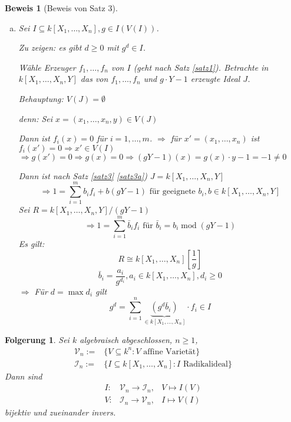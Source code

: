 \documentclass[a4paper, 12pt, numbers=noendperiod, chapterprefix=true, headsepline]{scrbook}
\theoremstyle{break}
\newtheorem{Folg}[Def]{Folgerung}
\theoremstyle{nonumberbreak}
\newtheorem{Bew}{Beweis}
\theoremstyle{nonumberplain}
\DeclareMathOperator{\modmodulo}{mod}%
\newcommand{\calI}{\mathcal{I}}
\newcommand{\calV}{\mathcal{V}}
\begin{document}
\begin{Bew}[Beweis von Satz 3]
\begin{enumerate}[a)]
\begin{enumerate}[(1)]
\begin{enumerate}[(1)]
		$R\neq k \Rightarrow k(X_1)$ ist nicht endlich erzeugbar als $k$-Algebra.
	\item $\Rightarrow R$ ist K\"orper: Sei $a\in R\backslash\{0\}$. In $L$ gibt es $\frac{1}{a}$
		\[\Rightarrow \left(\frac{1}{a}\right)^d+\sum_{j=0}^{d-1} b_j\left(\frac{1}{a} \right)^j\textrm{ f\"ur ein } d\geq1, b_j\in R\]
		\[\Rightarrow 1+\sum_{j=0}^{d-1} b_ja^{d-j} = 0, 1 = a\left( -\sum_{j=0}^{d-1}b_ja^{d-1-j} \right)\]
	\end{enumerate}\end{enumerate}
	
\item
Sei $I\subseteq k[X_1,\dots ,X_n], g\in I(V(I))$.

\emph{Zu zeigen:}  es gibt $d\geq 0$ mit $g^d\in I$.

W\"ahle Erzeuger $f_1,\dots , f_n$ von $I$ (geht nach Satz \ref{satz1}). Betrachte in $k[X_1,\dots ,X_n,Y]$ das von $f_1,\dots ,f_n$ und $g\cdot Y-1$ erzeugte Ideal $J$.

\emph{Behauptung:} $V(J) = \emptyset$

\emph{denn:} Sei $x= (x_1,\dots ,x_n, y) \in V(J)$

Dann ist $f_i(x)= 0$ f\"ur $i=1,\dots ,m$. $\Rightarrow $ f\"ur $x'=(x_1,\dots ,x_n)$ ist $f_i(x')=0 \Rightarrow x'\in V(I)$ $\Rightarrow g(x')=0 \Rightarrow g(x)=0\Rightarrow (gY-1)(x)=g(x)\cdot y-1 = -1 \not=0$

Dann ist nach Satz \ref{satz3} \ref{satz3a}) $J=k[X_1,\dots ,X_n,Y]$
	\[\Rightarrow 1= \sum_{i=1}^m b_i f_i + b(gY-1) \textrm{ f\"ur geeignete }b_i, b\in k[X_1,\dots ,X_n,Y]\]
Sei $R =k[X_1,\dots ,X_n,Y]/(gY-1)$
	\[\Rightarrow 1=\sum_{i=1}^m \bar{b}_if_i \textrm{ f\"ur }\bar{b}_i = b_i \modmodulo(gY-1)\]
\emph{Es gilt:} \[R\cong k[X_1,\dots ,X_n][\frac{1}{g}]\]
	\[\bar b_i= \frac{a_i}{g^{d_i}}, a_i\in k[X_1,\dots ,X_n], d_i \geq0\]
$\Rightarrow$ F\"ur $d= \max d_i$ gilt
	\[g^d = \sum_{i=1}^n \underbrace{\left( g^d \bar b_i \right)}_{\in k[X_1,\dots ,X_n]} \cdot f_i \in I\]
\end{enumerate}\end{Bew}

\begin{Folg}
Sei $k$ algebraisch abgeschlossen, $n\geq 1$,
	\[\begin{array}{rl}\calV_n := & \{V\subseteq k^n : V \textrm{ affine Variet\"at}\}\\
	\calI_n := & \{ I\subseteq k[X_1,\dots ,X_n] : I \textrm{ Radikalideal}\} \end{array}\]
Dann sind \[\begin{array}{rll}
	I: & \calV_n \to \calI_n, & V \mapsto I(V)\\
	V: & \calI_n \to \calV_n, & I \mapsto V(I)\end{array}\]
bijektiv und zueinander invers.
\end{Folg}
\end{document}
